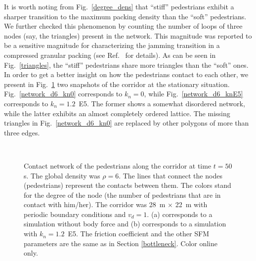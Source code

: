 \documentclass[preprint,12pt]{elsarticle}
\begin{document}
It is worth noting from Fig.~\ref{degree_dens} that ``stiff'' pedestrians
exhibit a sharper transition to the maximum packing density than  the ``soft''
pedestrians. We further checked this phenomenon by counting the  number of loops
of three nodes (say, the triangles) present in the network.  This magnitude was
reported to be a sensitive magnitude for characterizing the  jamming transition
in a compressed granular packing (see  Ref.~\cite{pugnaloni_2013} for details).
As can be seen in  Fig.~\ref{triangles}, the ``stiff'' pedestrians share more
triangles  than the ``soft'' ones.\\

In order to get a better insight on how the pedestrians contact to each other,
we present in Fig.~\ref{network_corridor} two snapshots of the corridor at the
stationary situation. Fig.~\ref{network_d6_kn0} corresponds to  $k_n=0$, while
Fig.~\ref{network_d6_knE5} corresponds to $k_n=1.2$~E5. The  former shows a
somewhat disordered network, while the latter exhibits an almost  completely
ordered lattice. The missing triangles in Fig.~\ref{network_d6_kn0}  are
replaced by other polygons of more than three edges. \\


\begin{figure}[!htbp]
\centering
{}\ 
\\
\caption[width=0.47\columnwidth]{Contact network of the pedestrians along the 
corridor at time $t=50\,$s. The global density was $\rho=6$.  The lines that 
connect the nodes (pedestrians) represent the contacts between them. The colors 
stand for the degree of the node (the number of pedestrians that are in contact 
with him/her). The corridor was 28~m $\times$ 22~m with periodic boundary 
conditions and $v_d=1$. (a) corresponds to a simulation without body force and 
(b) corresponds to a simulation with $k_n=1.2$~E5. The friction coefficient and 
the other SFM parameters are the same as in Section \ref{bottleneck}. Color 
online only.}
\label{network_corridor}
\end{figure}
\end{document}
